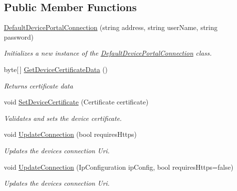 \subsection*{Public Member Functions}
\begin{DoxyCompactItemize}
\item 
\hyperlink{class_test_app_1_1_default_device_portal_connection_a6803c9400d8d70d923c5dc96409f2988}{Default\+Device\+Portal\+Connection} (string address, string user\+Name, string password)
\begin{DoxyCompactList}\small\item\em Initializes a new instance of the \hyperlink{class_test_app_1_1_default_device_portal_connection}{Default\+Device\+Portal\+Connection} class. \end{DoxyCompactList}\item 
byte\mbox{[}$\,$\mbox{]} \hyperlink{class_test_app_1_1_default_device_portal_connection_a245a96e6ab2fdf1967b41b9cb9d93ff9}{Get\+Device\+Certificate\+Data} ()
\begin{DoxyCompactList}\small\item\em Returns certificate data \end{DoxyCompactList}\item 
void \hyperlink{class_test_app_1_1_default_device_portal_connection_a9fc0104367db24d493f9151d3b27e0bf}{Set\+Device\+Certificate} (Certificate certificate)
\begin{DoxyCompactList}\small\item\em Validates and sets the device certificate. \end{DoxyCompactList}\item 
void \hyperlink{class_test_app_1_1_default_device_portal_connection_ae7b3715eb2593b867977c1b8053af74a}{Update\+Connection} (bool requires\+Https)
\begin{DoxyCompactList}\small\item\em Updates the device\textquotesingle{}s connection Uri. \end{DoxyCompactList}\item 
void \hyperlink{class_test_app_1_1_default_device_portal_connection_adc9d5c4cddd75df5200edf95d1c27aff}{Update\+Connection} (Ip\+Configuration ip\+Config, bool requires\+Https=false)
\begin{DoxyCompactList}\small\item\em Updates the device\textquotesingle{}s connection Uri. \end{DoxyCompactList}\end{DoxyCompactItemize}
